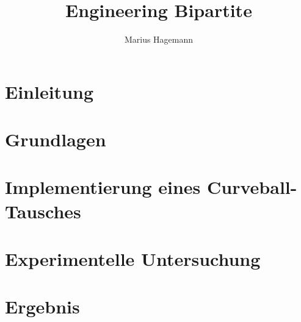 \documentclass[a1,portrait]{a0poster}
\author{Marius Hagemann}
\title{Engineering Bipartite \gc{}}
\newcommand{\ct}{Curveball-Tausch}
\begin{document}
\parindent0mm
\small

\begin{multicols}{2}
	

\section{\large Einleitung}



\section{\large Grundlagen}



\section{\large Implementierung eines \ct{es}}



\section{\large Experimentelle Untersuchung}



\section{\large Ergebnis}





\renewcommand\refname{\large Literatur}

\tiny{
	
	
}

\end{multicols}
\end{document}
